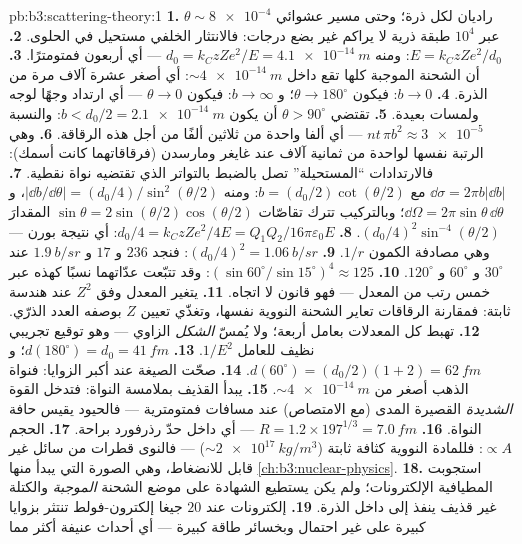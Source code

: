 \begin{solution}{pb:b3:scattering-theory:1}
\textbf{1.} $\theta \sim \num{8e-4}$ راديان لكل ذرة؛ وحتى مسير
عشوائي عبر $10^4$ طبقة ذرية لا يراكم غير بضع درجات:
فالانتثار الخلفي مستحيل في الحلوى.
\textbf{2.} $E = k_CzZe^2/d_0$: ومنه $d_0 = k_CzZe^2/E =
\qty{4.1e-14}{m}$ --- أي أربعون فمتومترًا.
\textbf{3.} أن الشحنة الموجبة كلها تقع داخل
$\sim\qty{4e-14}{m}$: أي أصغر عشرة آلاف مرة من الذرة.
\textbf{4.} $b \to 0$: فيكون $\theta \to 180^\circ$؛ و $b \to \infty$:
فيكون $\theta \to 0$ --- أي ارتداد وجهًا لوجه ولمسات بعيدة.
\textbf{5.} تقتضي $\theta > 90^\circ$ أن يكون $b < d_0/2 =
\qty{2.1e-14}{m}$: والنسبة $nt\,\pi b^2 \approx \num{3e-5}$ ---
أي ألفا واحدة من ثلاثين ألفًا من أجل هذه الرقاقة.
\textbf{6.} وهي الرتبة نفسها لواحدة من ثمانية آلاف عند غايغر
ومارسدن (فرقاقاتهما كانت أسمك): فالارتدادات ``المستحيلة''
تصل بالضبط بالتواتر الذي تقتضيه نواة نقطية.
\textbf{7.} $\dd\sigma = 2\pi b|\dd b|$ مع $b =
(d_0/2)\cot(\theta/2)$: ومنه $|\dd b/\dd\theta| = (d_0/4)/\sin^2(
\theta/2)$، و $\dd\Omega = 2\pi\sin\theta\,\dd\theta$؛
وبالتركيب تترك تقاصّات $\sin\theta = 2\sin(\theta/2)\cos(\theta/2)$
المقدارَ $(d_0/4)^2\sin^{-4}(\theta/2)$.
\textbf{8.} $d_0/4 = k_CzZe^2/4E = Q_1Q_2/16\pi\varepsilon_0E$:
أي نتيجة بورن --- وهي مصادفة الكمون $1/r$.
\textbf{9.} $(d_0/4)^2 = \qty{1.06}{b/sr}$: فنجد $236$ و $17$ و
$\qty{1.9}{b/sr}$ عند $30^\circ$ و $60^\circ$ و $120^\circ$.
\textbf{10.} $(\sin60^\circ/\sin15^\circ)^4 \approx 125$: وقد تتبّعت
عدّاتهما نسبًا كهذه عبر خمس رتب من المعدل --- فهو
قانون لا اتجاه.
\textbf{11.} يتغير المعدل وفق $Z^2$ عند هندسة ثابتة:
فمقارنة الرقاقات تعاير الشحنة النووية نفسها، وتغذّي
تعيين $Z$ بوصفه العدد الذرّي.
\textbf{12.} تهبط كل المعدلات بعامل أربعة؛ ولا يُمسّ \emph{الشكل}
الزاوي --- وهو توقيع تجريبي نظيف للعامل $1/E^2$.
\textbf{13.} $d(180^\circ) = d_0 = \qty{41}{fm}$؛ و $d(60^\circ) =
(d_0/2)(1 + 2) = \qty{62}{fm}$.
\textbf{14.} صحّت الصيغة عند أكبر الزوايا: فنواة الذهب
أصغر من $\sim\qty{4e-14}{m}$.
\textbf{15.} يبدأ القذيف بملامسة النواة: فتدخل القوة
\emph{الشديدة} القصيرة المدى (مع الامتصاص) عند مسافات
فمتومترية --- فالحيود يقيس حافة النواة.
\textbf{16.} $R = 1.2 \times 197^{1/3} = \qty{7.0}{fm}$ ---
أي داخل حدّ رذرفورد براحة.
\textbf{17.} الحجم $\propto A$: فللمادة النووية كثافة ثابتة
($\sim\qty{2e17}{kg/m^3}$) --- فالنوى قطرات من سائل غير
قابل للانضغاط، وهي الصورة التي يبدأ منها
\cref{ch:b3:nuclear-physics}.
\textbf{18.} استجوبت المطيافية الإلكترونات؛ ولم يكن يستطيع
الشهادة على موضع الشحنة \emph{الموجبة} والكتلة غير قذيف ينفذ
إلى داخل الذرة.
\textbf{19.} إلكترونات عند $20$ جيغا إلكترون-فولط تنتثر بزوايا
كبيرة على غير احتمال وبخسائر طاقة كبيرة --- أي أحداث عنيفة أكثر مما

\end{solution}
